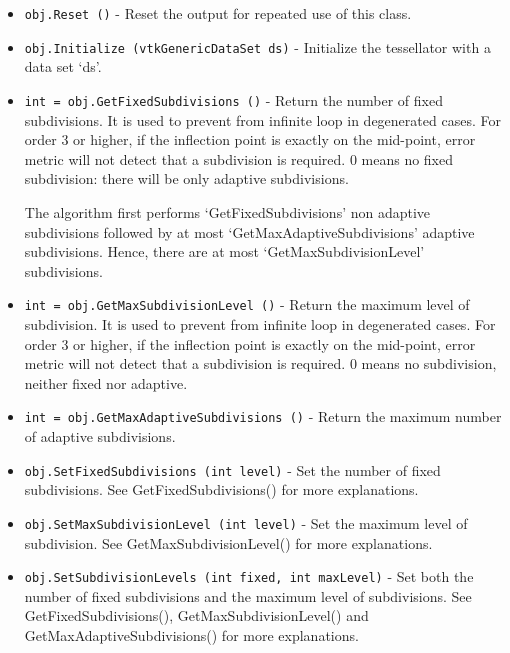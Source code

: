 \begin{itemize}
 
 
 
 
 

\item  \verb|obj.Reset ()| -  Reset the output for repeated use of this class.

\item  \verb|obj.Initialize (vtkGenericDataSet ds)| -  Initialize the tessellator with a data set `ds'.

\item  \verb|int = obj.GetFixedSubdivisions ()| -  Return the number of fixed subdivisions. It is used to prevent from
 infinite loop in degenerated cases. For order 3 or higher, if the
 inflection point is exactly on the mid-point, error metric will not
 detect that a subdivision is required. 0 means no fixed subdivision:
 there will be only adaptive subdivisions.

 The algorithm first performs `GetFixedSubdivisions' non adaptive
 subdivisions followed by at most `GetMaxAdaptiveSubdivisions' adaptive
 subdivisions. Hence, there are at most `GetMaxSubdivisionLevel'
 subdivisions.
 

\item  \verb|int = obj.GetMaxSubdivisionLevel ()| -  Return the maximum level of subdivision. It is used to prevent from
 infinite loop in degenerated cases. For order 3 or higher, if the
 inflection point is exactly on the mid-point, error metric will not
 detect that a subdivision is required. 0 means no subdivision,
 neither fixed nor adaptive.
 

\item  \verb|int = obj.GetMaxAdaptiveSubdivisions ()| -  Return the maximum number of adaptive subdivisions.
 

\item  \verb|obj.SetFixedSubdivisions (int level)| -  Set the number of fixed subdivisions. See GetFixedSubdivisions() for
 more explanations.
 
 

\item  \verb|obj.SetMaxSubdivisionLevel (int level)| -  Set the maximum level of subdivision. See GetMaxSubdivisionLevel() for
 more explanations.
 
 

\item  \verb|obj.SetSubdivisionLevels (int fixed, int maxLevel)| -  Set both the number of fixed subdivisions and the maximum level of
 subdivisions. See GetFixedSubdivisions(), GetMaxSubdivisionLevel() and
 GetMaxAdaptiveSubdivisions() for more explanations.
 
 
 
 

\end{itemize}
